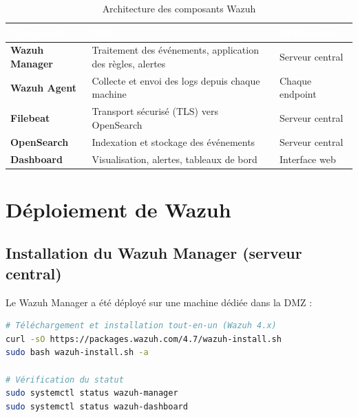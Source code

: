 \documentclass[12pt,a4paper,openany]{report}
\begin{document}
\begin{table}[H]
    \centering
    \renewcommand{\arraystretch}{1.8}
    \setlength{\tabcolsep}{10pt}
    \setlength{\arrayrulewidth}{0.8pt}
    \begin{tabularx}{\textwidth}{|>{\bfseries}p{3cm}|X|X|}
        \arrayrulecolor{tableborder}
        \hline
        \rowcolor{tableheadbg}
        \textcolor{white}{\textbf{Composant}} &
        \textcolor{white}{\textbf{Rôle}} &
        \textcolor{white}{\textbf{Déploiement}} \\
        \hline
        \rowcolor{tablerowalt}
        Wazuh Manager & Traitement des événements, application des règles, alertes & Serveur central \\
        \hline
        Wazuh Agent & Collecte et envoi des logs depuis chaque machine & Chaque endpoint \\
        \hline
        \rowcolor{tablerowalt}
        Filebeat & Transport sécurisé (TLS) vers OpenSearch & Serveur central \\
        \hline
        OpenSearch & Indexation et stockage des événements & Serveur central \\
        \hline
        \rowcolor{tablerowalt}
        Dashboard & Visualisation, alertes, tableaux de bord & Interface web \\
        \hline
    \end{tabularx}
    \caption{Architecture des composants Wazuh}
    \label{tab:wazuh-arch}
\end{table}

\section{Déploiement de Wazuh}

\subsection{Installation du Wazuh Manager (serveur central)}

Le Wazuh Manager a été déployé sur une machine dédiée dans la DMZ :

\begin{lstlisting}[language=bash, caption={Installation de Wazuh Manager via le script officiel}]
# Téléchargement et installation tout-en-un (Wazuh 4.x)
curl -sO https://packages.wazuh.com/4.7/wazuh-install.sh
sudo bash wazuh-install.sh -a

# Vérification du statut
sudo systemctl status wazuh-manager
sudo systemctl status wazuh-dashboard
\end{lstlisting}
\end{document}
